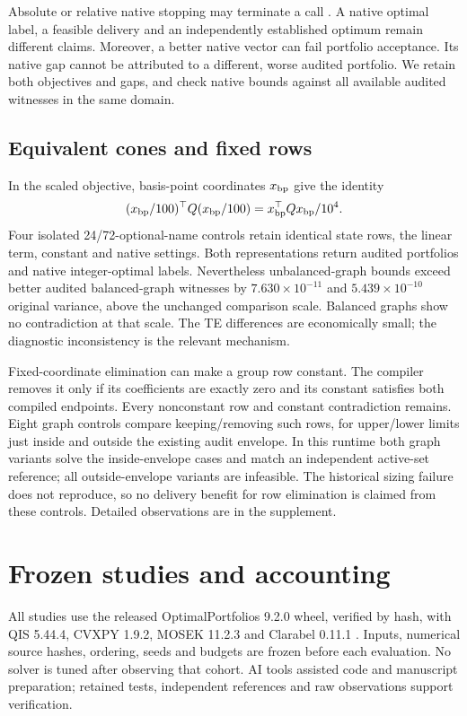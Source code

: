 \documentclass[preprint,12pt,authoryear]{elsarticle}
\begin{document}
Absolute or relative native stopping may terminate a call \citep{mosek}.
A native optimal label, a feasible delivery and an independently established
optimum remain different claims. Moreover, a better native vector can fail
portfolio acceptance. Its native gap cannot be attributed to a different,
worse audited portfolio. We retain both objectives and gaps, and check native
bounds against all available audited witnesses in the same domain.

\subsection{Equivalent cones and fixed rows}
In the scaled objective, basis-point coordinates $x_{\rm bp}$ give the identity
\[
 (x_{\rm bp}/100)^\top Q(x_{\rm bp}/100)
 =x_{\rm bp}^\top Qx_{\rm bp}/10^4.
\]
Four isolated
24/72-optional-name controls retain identical state rows, the linear term,
constant and native settings. Both representations return audited portfolios
and native integer-optimal labels. Nevertheless unbalanced-graph bounds exceed
better audited balanced-graph witnesses by $7.630\times10^{-11}$ and
$5.439\times10^{-10}$ original variance, above the unchanged comparison scale.
Balanced graphs show no contradiction at that scale. The TE differences are
economically small; the diagnostic inconsistency is the relevant mechanism.

Fixed-coordinate elimination can make a group row constant. The compiler removes
it only if its coefficients are exactly zero and its constant satisfies both
compiled endpoints. Every nonconstant row and constant contradiction remains.
Eight graph controls compare keeping/removing such rows, for upper/lower limits
just inside and outside the existing audit envelope. In this runtime both graph
variants solve the inside-envelope cases and match an independent active-set
reference; all outside-envelope variants are infeasible. The historical sizing
failure does not reproduce, so no delivery benefit for row elimination is claimed
from these controls. Detailed observations are in the supplement.

\section{Frozen studies and accounting}\label{sec:design}
All studies use the released OptimalPortfolios 9.2.0 wheel, verified by hash,
with QIS 5.44.4, CVXPY 1.9.2, MOSEK 11.2.3 and Clarabel 0.11.1
\citep{op,qis,cvxpy,clarabel,mosek}. Inputs, numerical source hashes, ordering,
seeds and budgets are frozen before each evaluation. No solver is tuned after
observing that cohort. AI tools assisted code and manuscript preparation;
retained tests, independent references and raw observations support verification.
\end{document}
